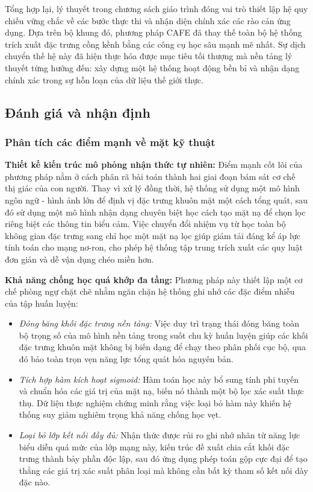 Tổng hợp lại, lý thuyết trong chương sách giáo trình đóng vai trò thiết lập hệ quy chiếu vững chắc về các bước thực thi và nhận diện chính xác các rào cản ứng dụng. Dựa trên bộ khung đó, phương pháp CAFE đã thay thế toàn bộ hệ thống trích xuất đặc trưng cồng kềnh bằng các công cụ học sâu mạnh mẽ nhất. Sự dịch chuyển thế hệ này đã hiện thực hóa được mục tiêu tối thượng mà nền tảng lý thuyết từng hướng đến: xây dựng một hệ thống hoạt động bền bỉ và nhận dạng chính xác trong sự hỗn loạn của dữ liệu thế giới thực.

\subsection{Đánh giá và nhận định}

\subsubsection{Phân tích các điểm mạnh về mặt kỹ thuật}

\textbf{Thiết kế kiến trúc mô phỏng nhận thức tự nhiên:} 
Điểm mạnh cốt lõi của phương pháp nằm ở cách phân rã bài toán thành hai giai đoạn bám sát cơ chế thị giác của con người. Thay vì xử lý đồng thời, hệ thống sử dụng một mô hình ngôn ngữ - hình ảnh lớn để định vị đặc trưng khuôn mặt một cách tổng quát, sau đó sử dụng một mô hình nhận dạng chuyên biệt học cách tạo mặt nạ để chọn lọc riêng biệt các thông tin biểu cảm. Việc chuyển đổi nhiệm vụ từ học toàn bộ không gian đặc trưng sang chỉ học một mặt nạ lọc giúp giảm tải đáng kể áp lực tính toán cho mạng nơ-ron, cho phép hệ thống tập trung trích xuất các quy luật đơn giản và dễ vận dụng chéo miền hơn.

\textbf{Khả năng chống học quá khớp đa tầng:} 
Phương pháp này thiết lập một cơ chế phòng ngự chặt chẽ nhằm ngăn chặn hệ thống ghi nhớ các đặc điểm nhiễu của tập huấn luyện:
\begin{itemize}
    \item \textit{Đóng băng khối đặc trưng nền tảng:} Việc duy trì trạng thái đóng băng toàn bộ trọng số của mô hình nền tảng trong suốt chu kỳ huấn luyện giúp các khối đặc trưng khuôn mặt không bị biến dạng để chạy theo phân phối cục bộ, qua đó bảo toàn trọn vẹn năng lực tổng quát hóa nguyên bản.
    \item \textit{Tích hợp hàm kích hoạt sigmoid:} Hàm toán học này bổ sung tính phi tuyến và chuẩn hóa các giá trị của mặt nạ, biến nó thành một bộ lọc xác suất thực thụ. Dữ liệu thực nghiệm chứng minh rằng việc loại bỏ hàm này khiến hệ thống suy giảm nghiêm trọng khả năng chống học vẹt.
    \item \textit{Loại bỏ lớp kết nối đầy đủ:} Nhận thức được rủi ro ghi nhớ nhãn từ năng lực biểu diễn quá mức của lớp mạng này, kiến trúc đề xuất chia cắt khối đặc trưng thành bảy phần độc lập, sau đó ứng dụng phép toán gộp cực đại để tạo thẳng các giá trị xác suất phân loại mà không cần bất kỳ tham số kết nối dày đặc nào.
\end{itemize}

